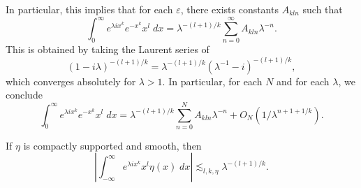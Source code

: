 \begin{remark}
  In particular, this implies that for each $\varepsilon$, there exists constants $A_{kln}$ such that
  \[ \int_0^\infty e^{\lambda i x^k} e^{-x^k} x^l\; dx = \lambda^{-(l+1)/k} \sum_{n = 0}^\infty A_{kln} \lambda^{-n}. \]
  This is obtained by taking the Laurent series of
  \[ (1 - i\lambda)^{-(l+1)/k} = \lambda^{-(l+1)/k} (\lambda^{-1} - i)^{-(l+1)/k}, \]
  which converges absolutely for $\lambda > 1$. In particular, for each $N$ and for each $\lambda$, we conclude
  \[ \int_0^\infty e^{\lambda i x^k} e^{-x^k} x^l\; dx = \lambda^{-(l+1)/k} \sum_{n = 0}^N A_{kln} \lambda^{-n} + O_N \left(1/\lambda^{n + 1 + 1/k} \right). \]
\end{remark}

\begin{lemma}
  If $\eta$ is compactly supported and smooth, then
  \[ \left| \int_{-\infty}^\infty e^{\lambda i x^k} x^l \eta(x)\; dx \right| \lesssim_{l,k,\eta} \lambda^{-(l + 1)/k}. \]
\end{lemma}
